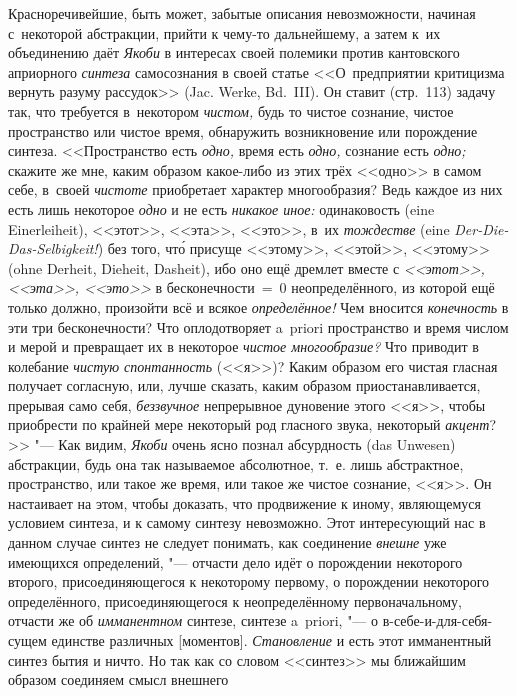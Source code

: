 Красноречивейшие, быть может, забытые описания невозможности, начиная
с~некоторой абстракции, прийти к чему-то дальнейшему, а затем к~их объединению
даёт {\em Якоби} в интересах своей полемики против кантовского априорного
{\em синтеза} самосознания в своей статье <<О~предприятии критицизма вернуть
разуму рассудок>> (Jac. Werke, Bd.~III). Он ставит (стр.~113) задачу так, что
требуется в~некотором {\em чистом,} будь то чистое сознание, чистое
пространство или чистое время, обнаружить возникновение или порождение синтеза.
<<Пространство есть {\em одно,} время есть {\em одно,} сознание есть
{\em одно;} скажите же мне, каким образом какое-либо из этих трёх <<одно>> в самом
себе, в~своей {\em чистоте} приобретает характер многообразия? Ведь
каждое из них есть лишь некоторое {\em одно} и не есть {\em никакое иное:}
одинаковость (eine Einer\-lei\-heit), <<этот>>, <<эта>>, <<это>>, в~их
{\em тождестве} (eine {\em Der-Die-Das-Selbigkeit!}) без того, чт\'{о} присуще
<<этому>>, <<этой>>, <<этому>> (ohne Derheit, Dieheit, Dasheit), ибо оно ещё
дремлет вместе с {\em <<этот>>, <<эта>>, <<это>>} в бесконечности~=~0
неопределённого, из которой ещё только должно, произойти всё и всякое
{\em определённое!} Чем вносится {\em конечность} в эти три бесконечности? Что
оплодотворяет a~priori пространство и время числом и мерой и превращает их в
некоторое {\em чистое многообразие?} Что приводит в колебание
{\em чистую спонтанность} (<<я>>)? Каким образом его чистая гласная получает согласную,
или, лучше сказать, каким образом приостанавливается, прерывая само себя,
{\em беззвучное} непрерывное дуновение этого <<я>>, чтобы приобрести по крайней мере
некоторый род гласного звука, некоторый {\em акцент}?>> "--- Как видим,
{\em Якоби} очень ясно познал абсурдность (das Unwesen) абстракции, будь она так
называемое абсолютное, т.~е. лишь абстрактное, пространство, или такое же
время, или такое же чистое сознание, <<я>>. Он настаивает на этом, чтобы
доказать, что продвижение к иному,
являющемуся условием синтеза, и к самому синтезу невозможно. Этот интересующий нас в
данном случае синтез не следует понимать, как соединение {\em внешне} уже
имеющихся определений, "--- отчасти дело идёт о порождении некоторого второго,
присоединяющегося к некоторому первому, о порождении некоторого определённого,
присоединяющегося к неопределённому первоначальному, отчасти же об
{\em имманентном} синтезе, синтезе a~priori, "--- о в-себе-и-для-себя-сущем единстве
различных [моментов]. {\em Становление} и есть этот имманентный синтез бытия и
ничто. Но так как со словом <<синтез>> мы ближайшим образом соединяем смысл внешнего
